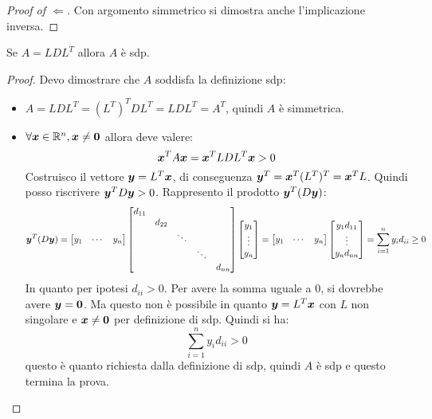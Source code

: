 \begin{proof}[Proof of $\Leftarrow$]
Con argomento simmetrico si dimostra anche l'implicazione inversa.
\end{proof}

\begin{exercise}[3.10]
Se $A = LDL^{T}$ allora $A$ \`e sdp.
\end{exercise}
\begin{proof}
Devo dimostrare che $A$ soddisfa la definizione sdp:
\begin{itemize}
\item $A = LDL^{T} = (L^{T})^{T}DL^{T} = LDL^{T} = A^{T}$, quindi $A$ \`e
simmetrica.
\item $\forall \boldsymbol{x} \in \mathbb{R}^{n}, \boldsymbol{x} \not = \boldsymbol{0}$ allora
deve valere:
\begin{displaymath}
\boldsymbol{x}^{T}A\boldsymbol{x} = \boldsymbol{x}^{T}LDL^{T}\boldsymbol{x} > 0
\end{displaymath}
Costruisco il vettore $\boldsymbol{y} = L^{T}\boldsymbol{x}$, di conseguenza $\boldsymbol{y}^{T}
= \boldsymbol{x}^{T}(L^{T})^{T} = \boldsymbol{x}^{T}L$. Quindi posso riscrivere
$\boldsymbol{y}^{T}D\boldsymbol{y} > 0$. Rappresento il prodotto $\boldsymbol{y}^{T}(D\boldsymbol{y})$:
\begin{displaymath}
\boldsymbol{y}^{T}(D\boldsymbol{y}) = 
\begin{bmatrix}
y_{1} & \cdots & y_{n}
\end{bmatrix}
\begin{bmatrix}
d_{11} \\
 & d_{22} \\
 & 		& \ddots \\
 & 		&		& \ddots\\
 &  	&  		&		& d_{nn}
\end{bmatrix}
\begin{bmatrix}
y_{1}\\
\vdots \\
y_{n}
\end{bmatrix} = 
\begin{bmatrix}
y_{1} & \cdots & y_{n}
\end{bmatrix}
\begin{bmatrix}
y_{1}d_{11}\\
\vdots \\
y_{n}d_{nn}
\end{bmatrix} =
\sum_{i = 1}^{n}{y_{i}d_{ii}} \geq 0
\end{displaymath} 
In quanto per ipotesi $d_{ii} > 0$. Per avere la somma uguale a 0, si dovrebbe
avere $\boldsymbol{y} = \boldsymbol{0}$. Ma questo non \`e possibile in quanto $\boldsymbol{y}  
= L^{T}\boldsymbol{x}$ con $L$ non singolare e $\boldsymbol{x} \not = \boldsymbol{0}$ per
definizione di sdp. Quindi si ha:
\begin{displaymath}
\sum_{i = 1}^{n}{y_{i}d_{ii}} > 0
\end{displaymath} 
questo \`e quanto richiesta dalla definizione di sdp, quindi $A$ \`e sdp e
questo termina la prova.
\end{itemize}
\end{proof}

